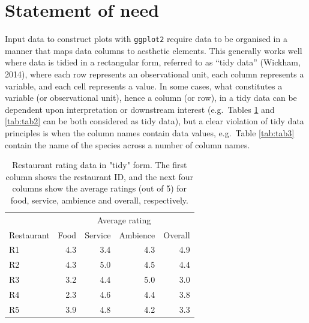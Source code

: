 \documentclass[10pt,a4paper,onecolumn]{article}
\begin{document}
\hypertarget{statement-of-need}{%
\section{Statement of need}\label{statement-of-need}}

Input data to construct plots with \texttt{ggplot2} require data to be
organised in a manner that maps data columns to aesthetic elements. This
generally works well where data is tidied in a rectangular form,
referred to as ``tidy data'' (Wickham, 2014), where each row represents
an observational unit, each column represents a variable, and each cell
represents a value. In some cases, what constitutes a variable (or
observational unit), hence a column (or row), in a tidy data can be
dependent upon interpretation or downstream interest (e.g.~Tables
\ref{tab:tab1} and \ref{tab:tab2} can be both considered as tidy data),
but a clear violation of tidy data principles is when the column names
contain data values, e.g.~Table \ref{tab:tab3} contain the name of the
species across a number of column names.

\begin{table}

\caption{\label{tab:tab1}Restaurant rating data in "tidy" form. The first column shows the restaurant ID, and the next four columns show the average ratings (out of 5) for food, service, ambience and overall, respectively.}
\centering
\begin{tabular}[t]{lrrrr}
\toprule
\multicolumn{1}{c}{ } & \multicolumn{4}{c}{Average rating} \\
\cmidrule(l{3pt}r{3pt}){2-5}
Restaurant & Food & Service & Ambience & Overall\\
\midrule
R1 & 4.3 & 3.4 & 4.3 & 4.9\\
R2 & 4.3 & 5.0 & 4.5 & 4.4\\
R3 & 3.2 & 4.4 & 5.0 & 3.0\\
R4 & 2.3 & 4.6 & 4.4 & 3.8\\
R5 & 3.9 & 4.8 & 4.2 & 3.3\\
\bottomrule
\end{tabular}
\end{table}
\end{document}
